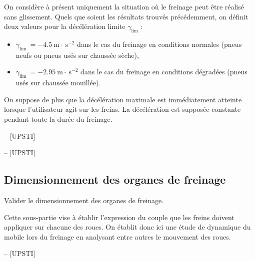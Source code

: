 On considère à présent uniquement la situation où le freinage peut être réalisé sans glissement. Quels que soient les résultats trouvés précédemment, on définit deux valeurs pour la décélération limite \(\gamma_{\text{lim}}\) :

\begin{itemize}
  \item \(\gamma_{\text {lim }}=-4.5 \mathrm{~m} \cdot \mathrm{~s}^{-2}\) dans le cas du freinage en conditions normales (pneus neufs ou pneus usés sur chaussée sèche),
  \item \(\gamma_{\text {lim }}=-2.95 \mathrm{~m} \cdot \mathrm{~s}^{-2}\) dans le cas du freinage en conditions dégradées (pneus usés sur chaussée mouillée).
\end{itemize}

On suppose de plus que la décélération maximale est immédiatement atteinte lorsque l'utilisateur agit sur les freins. La décélération est supposée constante pendant toute la durée du freinage.


\ifprof
\begin{corrige}-- [UPSTI]
\end{corrige}
\else
\fi

\ifprof
\begin{corrige}-- [UPSTI]
\end{corrige}
\else
\fi

\subsection{Dimensionnement des organes de freinage}

\begin{obj}
Valider le dimensionnement des organes de freinage.
\end{obj}

Cette sous-partie vise à établir l'expression du couple que les freins doivent appliquer sur chacune des roues. On établit donc ici une étude de dynamique du mobile lors du freinage en analysant entre autres le mouvement des roues.

\ifprof
\begin{corrige}-- [UPSTI]
\end{corrige}
\else
\fi

